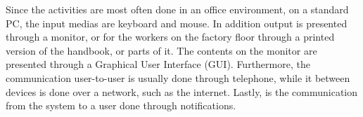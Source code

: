 Since the activities are most often done in an office environment, on a standard PC, the input medias are keyboard and mouse.
In addition output is presented through a monitor, or for the workers on the factory floor through a printed version of the handbook, or parts of it.
The contents on the monitor are presented through a Graphical User Interface (GUI).
Furthermore, the communication user-to-user is usually done through telephone, while it between devices is done over a network, such as the internet.
Lastly, is the communication from the system to a user done through notifications.

